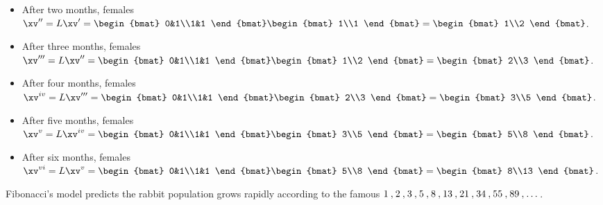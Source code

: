 \begin{example}
\begin{itemize}
\item After two months,  females \(\xv''=L\xv'=\begin{bmat} 0&1\\1&1 \end{bmat}\begin{bmat} 1\\1 \end{bmat}=\begin{bmat} 1\\2 \end{bmat}\).
\item After three months,  females \(\xv'''=L\xv''=\begin{bmat} 0&1\\1&1 \end{bmat}\begin{bmat} 1\\2 \end{bmat}=\begin{bmat} 2\\3 \end{bmat}\).
\item After four months,  females \(\xv^{iv}=L\xv'''=\begin{bmat} 0&1\\1&1 \end{bmat}\begin{bmat} 2\\3 \end{bmat}=\begin{bmat} 3\\5 \end{bmat}\).
\item After five months,  females \(\xv^{v}=L\xv^{iv}=\begin{bmat} 0&1\\1&1 \end{bmat}\begin{bmat} 3\\5 \end{bmat}=\begin{bmat} 5\\8 \end{bmat}\).
\item After six months,  females \(\xv^{vi}=L\xv^{v}=\begin{bmat} 0&1\\1&1 \end{bmat}\begin{bmat} 5\\8 \end{bmat}=\begin{bmat} 8\\13 \end{bmat}\).
\end{itemize}
Fibonacci's model predicts the rabbit population grows rapidly according to the famous  \(\mathcode`\,="213B 1,2,3,5,8,13,21,34,55,89,\ldots\)\,.
\end{example}





